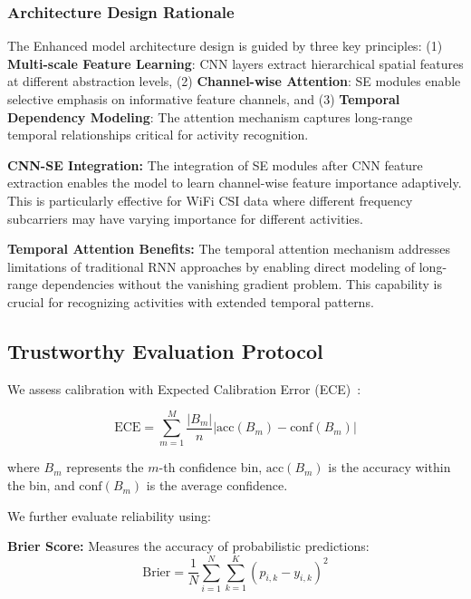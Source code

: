 \documentclass[journal]{IEEEtran}
\begin{document}
\subsubsection{Architecture Design Rationale}

The Enhanced model architecture design is guided by three key principles: (1) \textbf{Multi-scale Feature Learning}: CNN layers extract hierarchical spatial features at different abstraction levels, (2) \textbf{Channel-wise Attention}: SE modules enable selective emphasis on informative feature channels, and (3) \textbf{Temporal Dependency Modeling}: The attention mechanism captures long-range temporal relationships critical for activity recognition.

\textbf{CNN-SE Integration:} The integration of SE modules after CNN feature extraction enables the model to learn channel-wise feature importance adaptively. This is particularly effective for WiFi CSI data where different frequency subcarriers may have varying importance for different activities.

\textbf{Temporal Attention Benefits:} The temporal attention mechanism addresses limitations of traditional RNN approaches by enabling direct modeling of long-range dependencies without the vanishing gradient problem. This capability is crucial for recognizing activities with extended temporal patterns.

\subsection{Trustworthy Evaluation Protocol}

We assess calibration with Expected Calibration Error (ECE)~\cite{calibration_guo2017}:

\begin{equation}
\text{ECE} = \sum_{m=1}^{M} \frac{|B_m|}{n} |\text{acc}(B_m) - \text{conf}(B_m)|
\end{equation}

where $B_m$ represents the $m$-th confidence bin, $\text{acc}(B_m)$ is the accuracy within the bin, and $\text{conf}(B_m)$ is the average confidence.

We further evaluate reliability using:

\textbf{Brier Score:} Measures the accuracy of probabilistic predictions:
\begin{equation}
\text{Brier} = \frac{1}{N} \sum_{i=1}^{N} \sum_{k=1}^{K} (p_{i,k} - y_{i,k})^2
\end{equation}
\end{document}
